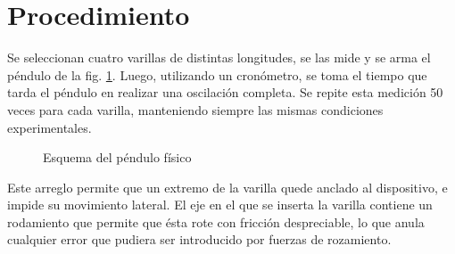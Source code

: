 \section{Procedimiento}

Se seleccionan cuatro varillas de distintas longitudes, se las mide y se arma
el péndulo de la fig. \ref{fig:procedimiento:esquema-pendulo}. Luego, utilizando
un cronómetro, se toma el tiempo que tarda el péndulo en realizar una
oscilación completa. Se repite esta medición 50 veces para cada varilla,
manteniendo siempre las mismas condiciones experimentales.

\begin{figure}[H]
    \centering
    
    \caption{Esquema del péndulo físico}
    \label{fig:procedimiento:esquema-pendulo}
\end{figure}

Este arreglo permite que un extremo de la varilla quede anclado al dispositivo,
e impide su movimiento lateral. El eje en el que se inserta la
varilla contiene un rodamiento que permite que ésta rote con fricción
despreciable, lo que anula cualquier error que pudiera ser introducido por
fuerzas de rozamiento.
